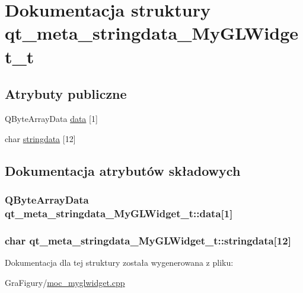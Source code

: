 \hypertarget{structqt__meta__stringdata__MyGLWidget__t}{\section{Dokumentacja struktury qt\-\_\-meta\-\_\-stringdata\-\_\-\-My\-G\-L\-Widget\-\_\-t}
\label{structqt__meta__stringdata__MyGLWidget__t}
}
\subsection*{Atrybuty publiczne}
\begin{DoxyCompactItemize}
\item 
Q\-Byte\-Array\-Data \hyperlink{structqt__meta__stringdata__MyGLWidget__t_a48486113b73e5a5b34b933da977013cb}{data} \mbox{[}1\mbox{]}
\item 
char \hyperlink{structqt__meta__stringdata__MyGLWidget__t_a032f4dbb1b97108e5ab0a3c44791270e}{stringdata} \mbox{[}12\mbox{]}
\end{DoxyCompactItemize}


\subsection{Dokumentacja atrybutów składowych}
\hypertarget{structqt__meta__stringdata__MyGLWidget__t_a48486113b73e5a5b34b933da977013cb}{
\subsubsection[{data}]{\setlength{\rightskip}{0pt plus 5cm}Q\-Byte\-Array\-Data qt\-\_\-meta\-\_\-stringdata\-\_\-\-My\-G\-L\-Widget\-\_\-t\-::data\mbox{[}1\mbox{]}}}\label{structqt__meta__stringdata__MyGLWidget__t_a48486113b73e5a5b34b933da977013cb}
\hypertarget{structqt__meta__stringdata__MyGLWidget__t_a032f4dbb1b97108e5ab0a3c44791270e}{
\subsubsection[{stringdata}]{\setlength{\rightskip}{0pt plus 5cm}char qt\-\_\-meta\-\_\-stringdata\-\_\-\-My\-G\-L\-Widget\-\_\-t\-::stringdata\mbox{[}12\mbox{]}}}\label{structqt__meta__stringdata__MyGLWidget__t_a032f4dbb1b97108e5ab0a3c44791270e}


Dokumentacja dla tej struktury została wygenerowana z pliku\-:\begin{DoxyCompactItemize}
\item 
Gra\-Figury/\hyperlink{moc__myglwidget_8cpp}{moc\-\_\-myglwidget.\-cpp}\end{DoxyCompactItemize}

